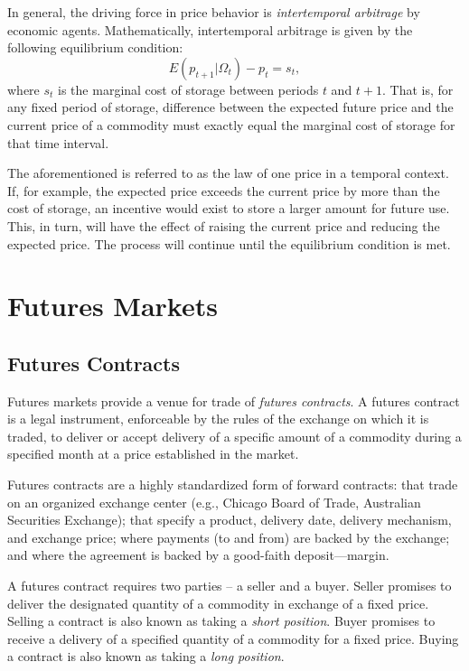 \documentclass[]{book}
\begin{document}
In general, the driving force in price behavior is \emph{intertemporal
arbitrage} by economic agents. Mathematically, intertemporal arbitrage
is given by the following equilibrium condition:
\[E\left(p_{t+1}|\Omega_t\right)-p_{t} = s_t,\] where \(s_t\) is the
marginal cost of storage between periods \(t\) and \(t+1\). That is, for
any fixed period of storage, difference between the expected future
price and the current price of a commodity must exactly equal the
marginal cost of storage for that time interval.

The aforementioned is referred to as the law of one price in a temporal
context. If, for example, the expected price exceeds the current price
by more than the cost of storage, an incentive would exist to store a
larger amount for future use. This, in turn, will have the effect of
raising the current price and reducing the expected price. The process
will continue until the equilibrium condition is met.

\chapter{Futures Markets}\label{futures-markets}

\section{Futures Contracts}\label{futures-contracts}

Futures markets provide a venue for trade of \emph{futures contracts}. A
futures contract is a legal instrument, enforceable by the rules of the
exchange on which it is traded, to deliver or accept delivery of a
specific amount of a commodity during a specified month at a price
established in the market.

Futures contracts are a highly standardized form of forward contracts:
that trade on an organized exchange center (e.g., Chicago Board of
Trade, Australian Securities Exchange); that specify a product, delivery
date, delivery mechanism, and exchange price; where payments (to and
from) are backed by the exchange; and where the agreement is backed by a
good-faith deposit---margin.

A futures contract requires two parties -- a seller and a buyer. Seller
promises to deliver the designated quantity of a commodity in exchange
of a fixed price. Selling a contract is also known as taking a
\emph{short position}. Buyer promises to receive a delivery of a
specified quantity of a commodity for a fixed price. Buying a contract
is also known as taking a \emph{long position}.
\end{document}
